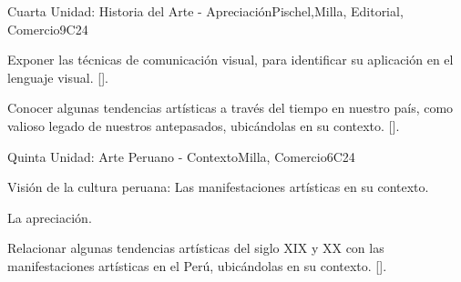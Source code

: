 \begin{syllabus}
\begin{unit}{}{Cuarta Unidad: Historia del Arte - Apreciación}{Pischel,Milla, Editorial, Comercio}{9}{C24}
\begin{learningoutcomes}
	\item Exponer las técnicas de comunicación visual, para identificar su aplicación en el lenguaje visual. [\Usage].
	\item Conocer algunas tendencias artísticas a través del tiempo en nuestro país, como valioso legado de nuestros antepasados, ubicándolas en su contexto. [\Usage].
\end{learningoutcomes}
\end{unit}

\begin{unit}{}{Quinta Unidad: Arte Peruano - Contexto}{Milla, Comercio}{6}{C24}
\begin{topics}
	\item Visión de la cultura peruana: Las manifestaciones artísticas en su contexto.
	\item La apreciación.
\end{topics}
\begin{learningoutcomes}
	\item Relacionar  algunas tendencias artísticas del siglo XIX y XX con las manifestaciones artísticas en el Perú, ubicándolas en su contexto. [\Usage].
\end{learningoutcomes}
\end{unit}



\begin{coursebibliography}
\end{coursebibliography}
\end{syllabus}
